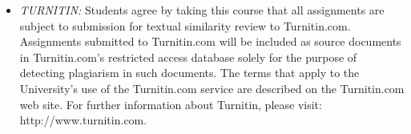 \documentclass[article,oneside]{memoir}
\begin{document}
\begin{itemize}
\item \textit{TURNITIN:} Students agree by taking this course that all assignments are subject to submission for textual similarity review to Turnitin.com. Assignments submitted to Turnitin.com will be included as source documents in Turnitin.com’s restricted access database solely for the purpose of detecting plagiarism in such documents. The terms that apply to the University’s use of the Turnitin.com service are described on the Turnitin.com web site. For further information about Turnitin, please visit: http://www.turnitin.com.

\end{itemize}






\end{document}
